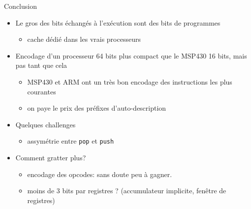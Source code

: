 \documentclass[slidetop,11pt,table]{beamer}
\begin{document}
\begin{frame}{Conclusion}
  \begin{itemize}
  \item Le gros des bits échangés à l'exécution sont des bits de programmes
    \begin{itemize}
    \item cache dédié dans les vrais processeurs
    \end{itemize}
  \item Encodage d'un processeur 64 bits plus compact que le MSP430 16 bits, mais pas tant que cela
    \begin{itemize}
    \item MSP430 et ARM ont un très bon encodage des instructions les plus courantes
    \item on paye le prix des préfixes d'auto-description
    \end{itemize}
  \item Quelques challenges
    \begin{itemize}
    \item assymétrie entre \texttt{pop} et \texttt{push}
    \end{itemize}
  \item Comment gratter plus?
    \begin{itemize}
    \item encodage des opcodes: sans doute peu à gagner.
    \item moins de 3 bits par registres ? (accumulateur implicite, fenêtre de registres)
    \end{itemize}
  \end{itemize}

\end{frame}
\end{document}
